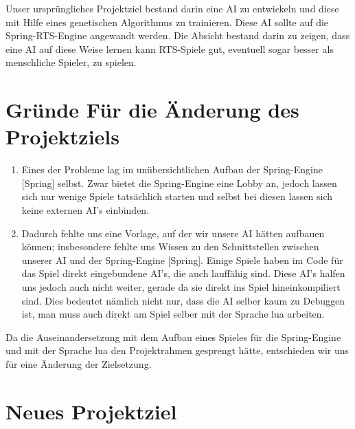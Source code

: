 \documentclass[
	12pt,
	a4paper,
	BCOR10mm,
	DIV14,
	headsepline,
	usegeometry,
]{scrreprt}
\begin{document}
Unser ursprüngliches Projektziel bestand darin eine AI zu entwickeln und diese mit Hilfe eines genetischen Algorithmus zu trainieren. Diese AI sollte auf die Spring-RTS-Engine \cite{spring} angewandt werden. Die Absicht bestand darin zu zeigen, dass eine AI auf diese Weise lernen kann RTS-Spiele gut, eventuell sogar besser als menschliche Spieler, zu spielen.\\

\section{Gründe Für die Änderung des Projektziels}
\begin{enumerate}
	\item Eines der Probleme lag im unübersichtlichen Aufbau der Spring-Engine [Spring] selbst. 
		Zwar bietet die Spring-Engine eine Lobby an, jedoch lassen sich nur wenige Spiele tatsächlich starten und selbst bei diesen lassen sich keine externen AI's einbinden. 

	\item	Dadurch fehlte uns eine Vorlage, auf der wir unsere AI hätten aufbauen können; insbesondere fehlte uns Wissen zu den Schnittstellen zwischen unserer AI und der Spring-Engine [Spring].
		Einige Spiele haben im Code für das Spiel direkt eingebundene AI's, die auch lauffähig sind. 
		Diese AI's halfen uns jedoch auch nicht weiter, gerade da sie direkt ins Spiel hineinkompiliert sind. 
		Dies bedeutet nämlich nicht nur, dass die AI selber kaum zu Debuggen ist, man muss auch direkt am Spiel selber mit der Sprache lua arbeiten. 
\end{enumerate}

Da die Auseinandersetzung mit dem Aufbau eines Spieles für die Spring-Engine und mit der Sprache lua den Projektrahmen gesprengt hätte, entschieden wir uns für eine Änderung der Zielsetzung.

\section{Neues Projektziel}
\end{document}
